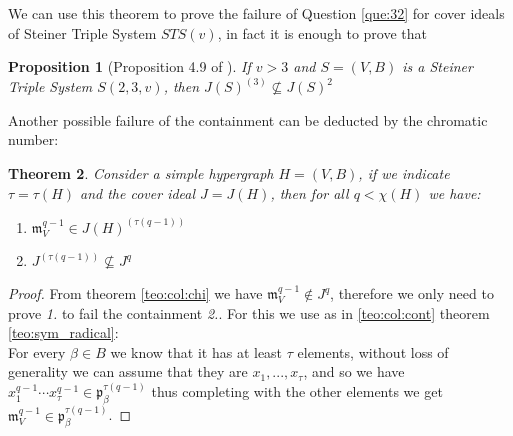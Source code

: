 \documentclass[notitlepage, a4]{book}
\theoremstyle{plain}
\newtheorem{teo}{Theorem}[section]
\newtheorem{prop}[teo]{Proposition}
\theoremstyle{remark}
\theoremstyle{definition}
\newcommand{\p}{\mathfrak{p}}
\newcommand{\mm}{\mathfrak{m}}
\newcounter{que}
\begin{document}
We can use this theorem to prove the failure of Question \ref{que:32} for cover ideals of Steiner Triple System $ STS(v) $, in fact it is enough to prove that 
\begin{prop}[Proposition 4.9 of \cite{Bal21Steiner}]
If $ v>3 $ and $ S = (V,B) $ is a Steiner Triple System $ S(2,3,v) $, then $ J(S)^{(3)}  \not \subseteq J(S)^2$
\end{prop}




Another possible failure of the containment can be deducted by the chromatic number:

\begin{teo} \label{teo:borin1}
	Consider a simple hypergraph $H = (V,B)$, if we indicate $\tau = \tau (H)$ and the cover ideal $ J = J(H)$,  then for all $ q < \chi(H)$ we have: 
	\begin{enumerate}
	\item $ \mm_V^{q-1} \in J(H)^{( \tau (q-1) )} $
	\item $ J^{( \tau(q-1) )} \not \subseteq J^q $
	\end{enumerate}
\end{teo}


\begin{proof}
	From theorem \ref{teo:col:chi} we have $\mm_V^{q-1} \not \in J^q$, therefore we only need to prove \textit{1.} to fail the containment \textit{2.}. For this we use as in \ref{teo:col:cont} theorem \ref{teo:sym_radical}:\\
	For every $\beta \in B $ we know that it has at least $	\tau$ elements, without loss of generality we can assume that they are $x_1 , ... , x_\tau$, and so we have $x_1^{q-1} \cdots  x_\tau^{q-1} \in \p_\beta^{\tau(q -1)} $ thus completing with the other elements we get $\mm_V^{q-1} \in \p_\beta^{\tau(q -1)} $. 
\end{proof} 


\backmatter
\printbibliography
\end{document}
